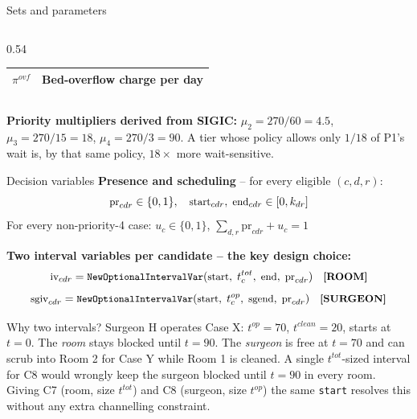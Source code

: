 \documentclass[10pt,aspectratio=169]{beamer}
\begin{document}
\begin{frame}{Sets and parameters}
\begin{columns}
\begin{column}{0.54\textwidth}
\begin{center}
\begin{tabular}{cl}
        $\pi^{ovf}$ & Bed-overflow charge per day \\
        \bottomrule
      \end{tabular}
      \end{center}
    \end{column}
  \end{columns}
  \vspace{0.3em}
  \footnotesize\textbf{Priority multipliers derived from SIGIC:}
  $\mu_2=270/60=4.5$,\; $\mu_3=270/15=18$,\; $\mu_4=270/3=90$.
  A tier whose policy allows only $1/18$ of P1's wait is, by that same
  policy, $18\times$ more wait-sensitive.
\end{frame}

\begin{frame}{Decision variables}
  \textbf{Presence and scheduling} -- for every eligible $(c,d,r)$:
  \[\small
    \text{pr}_{cdr}\in\{0,1\},\quad
    \text{start}_{cdr},\;\text{end}_{cdr}\in[0,k_{dr}]
  \]
  For every non-priority-4 case: $u_c\in\{0,1\}$,\quad
  $\sum_{d,r}\text{pr}_{cdr}+u_c=1$

  \vspace{0.3em}
  \textbf{Two interval variables per candidate -- the key design choice:}
  \[\small
    \text{iv}_{cdr}=\texttt{NewOptionalIntervalVar}(\text{start},\;t_c^{tot},\;\text{end},\;\text{pr}_{cdr})
    \quad\textbf{[ROOM]}
  \]
  \[\small
    \text{sgiv}_{cdr}=\texttt{NewOptionalIntervalVar}(\text{start},\;t_c^{op},\;\text{sgend},\;\text{pr}_{cdr})
    \quad\textbf{[SURGEON]}
  \]
  \begin{block}{Why two intervals?}
    \small Surgeon H operates Case X: $t^{op}=70$, $t^{clean}=20$, starts at
    $t=0$. The \emph{room} stays blocked until $t=90$. The \emph{surgeon}
    is free at $t=70$ and can scrub into Room 2 for Case Y while Room 1
    is cleaned. A single $t^{tot}$-sized interval for C8 would wrongly
    keep the surgeon blocked until $t=90$ in every room. Giving C7
    (room, size $t^{tot}$) and C8 (surgeon, size $t^{op}$) the same
    \texttt{start} resolves this without any extra channelling constraint.
  \end{block}
\end{frame}
\end{document}
